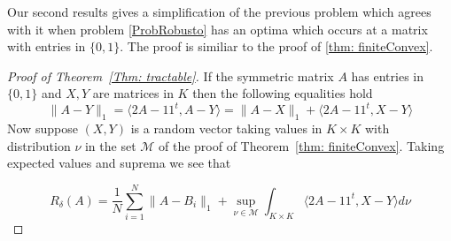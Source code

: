 \documentclass[12pt]{amsart}
\theoremstyle{remark}
\begin{document}
Our second results gives a simplification of the previous problem which agrees with it when problem \ref{ProbRobusto} has an optima which occurs at a matrix with entries in $\{0,1\}$. The proof is similiar to the proof of \ref{thm: finiteConvex}.


\begin{proof}[Proof of Theorem~\ref{Thm: tractable}]
If the symmetric matrix $A$ has entries in $\{0,1\}$ and $X, Y$ are matrices in $K$ then the following equalities hold
\[\|A-Y\|_1 =\langle 2A-11^t, A-Y\rangle=\|A-X\|_1+\langle 2A-11^t, X-Y\rangle\]
Now suppose $(X,Y)$ is a random vector taking values in $K\times K$ with distribution $\nu$ in the set $\mathcal{M}$ of the proof of Theorem~\ref{thm: finiteConvex}. Taking expected values and suprema we see that

\begin{equation}\label{eq: util}
R_{\delta}(A)= \frac{1}{N}\sum_{i=1}^N \|A-B_i\|_1 + \sup_{\nu\in \mathcal{M}} \int_{K\times K} \langle 2A-11^t, X-Y\rangle d\nu
\end{equation}


\end{proof}
\end{document}
